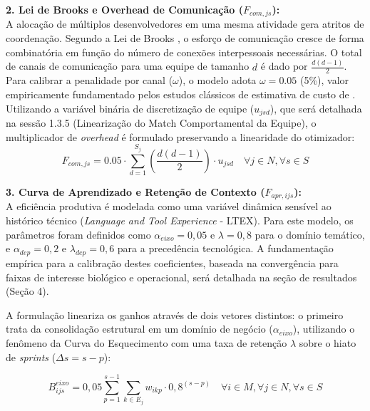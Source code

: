 \documentclass[a4paper,11pt]{article}
\begin{document}
\vspace{0.2cm}
\noindent\textbf{2. Lei de Brooks e Overhead de Comunicação ($F_{com, js}$):} \\
A alocação de múltiplos desenvolvedores em uma mesma atividade gera atritos de coordenação. Segundo a Lei de Brooks \citep{brooks1975}, o esforço de comunicação cresce de forma combinatória em função do número de conexões interpessoais necessárias. O total de canais de comunicação para uma equipe de tamanho $d$ é dado por $\frac{d(d-1)}{2}$. Para calibrar a penalidade por canal ($\omega$), o modelo adota $\omega = 0.05$ (5\%), valor empiricamente fundamentado pelos estudos clássicos de estimativa de custo de \citet{boehm1981}. Utilizando a variável binária de discretização de equipe ($u_{jsd}$), que será detalhada na sessão 1.3.5 (Linearização do Match Comportamental da Equipe), o multiplicador de \textit{overhead} é formulado preservando a linearidade do otimizador:
\begin{equation}
    F_{com, js} = 0.05 \cdot \sum_{d=1}^{S_j} \left( \frac{d(d-1)}{2} \right) \cdot u_{jsd} \quad \forall j \in N, \forall s \in S
\end{equation}

\vspace{0.2cm}
\noindent\textbf{3. Curva de Aprendizado e Retenção de Contexto ($F_{apr, ijs}$):} \\
A eficiência produtiva é modelada como uma variável dinâmica sensível ao histórico técnico (\textit{Language and Tool Experience} - LTEX). Para este modelo, os parâmetros foram definidos como $\alpha_{eixo} = 0,05$ e $\lambda = 0,8$ para o domínio temático, e $\alpha_{dep} = 0,2$ e $\lambda_{dep} = 0,6$ para a precedência tecnológica. A fundamentação empírica para a calibração destes coeficientes, baseada na convergência para faixas de interesse biológico e operacional, será detalhada na seção de resultados (Seção 4).

A formulação lineariza os ganhos através de dois vetores distintos: o primeiro trata da consolidação estrutural em um domínio de negócio ($\alpha_{eixo}$), utilizando o fenômeno da Curva do Esquecimento \citep{ebbinghaus1885} com uma taxa de retenção $\lambda$ sobre o hiato de \textit{sprints} ($\Delta s = s - p$):

\begin{equation}
    B^{eixo}_{ijs} = 0,05 \sum_{p=1}^{s-1} \sum_{k \in E_j} w_{ikp} \cdot 0,8^{(s-p)} \quad \forall i \in M, \forall j \in N, \forall s \in S
\end{equation}
\end{document}
